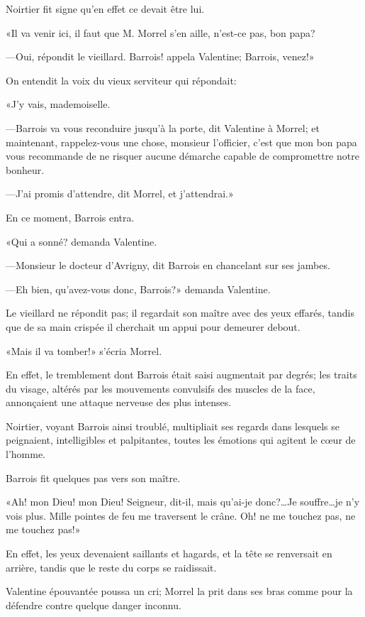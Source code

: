 Noirtier fit signe qu'en effet ce devait être lui. 

«Il va venir ici, il faut que M. Morrel s'en aille, n'est-ce pas, bon papa? 

—Oui, répondit le vieillard. Barrois! appela Valentine; Barrois, venez!» 

On entendit la voix du vieux serviteur qui répondait: 

«J'y vais, mademoiselle. 

—Barrois va vous reconduire jusqu'à la porte, dit Valentine à Morrel; et maintenant, rappelez-vous une chose, monsieur l'officier, c'est que mon bon papa vous recommande de ne risquer aucune démarche capable de compromettre notre bonheur. 

—J'ai promis d'attendre, dit Morrel, et j'attendrai.» 

En ce moment, Barrois entra. 

«Qui a sonné? demanda Valentine. 

—Monsieur le docteur d'Avrigny, dit Barrois en chancelant sur ses jambes. 

—Eh bien, qu'avez-vous donc, Barrois?» demanda Valentine. 

Le vieillard ne répondit pas; il regardait son maître avec des yeux effarés, tandis que de sa main crispée il cherchait un appui pour demeurer debout. 

«Mais il va tomber!» s'écria Morrel. 

En effet, le tremblement dont Barrois était saisi augmentait par degrés; les traits du visage, altérés par les mouvements convulsifs des muscles de la face, annonçaient une attaque nerveuse des plus intenses. 

Noirtier, voyant Barrois ainsi troublé, multipliait ses regards dans lesquels se peignaient, intelligibles et palpitantes, toutes les émotions qui agitent le cœur de l'homme. 

Barrois fit quelques pas vers son maître. 

«Ah! mon Dieu! mon Dieu! Seigneur, dit-il, mais qu'ai-je donc?\dots Je souffre\dots je n'y vois plus. Mille pointes de feu me traversent le crâne. Oh! ne me touchez pas, ne me touchez pas!» 

En effet, les yeux devenaient saillants et hagards, et la tête se renversait en arrière, tandis que le reste du corps se raidissait. 

Valentine épouvantée poussa un cri; Morrel la prit dans ses bras comme pour la défendre contre quelque danger inconnu. 

